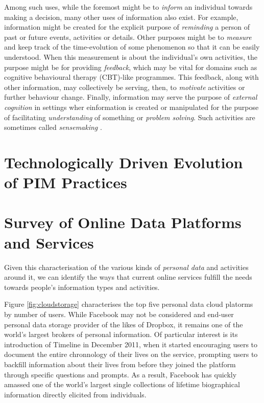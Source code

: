\documentclass[runningheads,a4paper]{llncs}
\begin{document}
Among such uses, while the foremost might be to \emph{inform} an individual towards making a decision, many other uses of information also exist.  For example, information might be created for the explicit purpose of \emph{reminding} a person of past or future events, activities or details. Other purposes might be to \emph{measure} and keep track of the time-evolution of some phenomenon so that it can be easily understood.  When this measurement is about the individual's own activities, the purpose might be for providing \emph{feedback}, which may be vital for domains such as cognitive behavioural therapy (CBT)-like programmes.  This feedback, along with other information, may collectively be serving, then, to \emph{motivate} activities or further behaviour change.  Finally, information may serve the purpose of \emph{external cognition} in settings wher einformation is created or manipulated for the purpose of facilitating \emph{understanding} of something or \emph{problem solving}.  Such activities are sometimes called \emph{sensemaking} \cite{sensemaking}.

\section{Technologically Driven Evolution of PIM Practices}

\section{Survey of Online Data Platforms and Services}

Given this characterisation of the various kinds of \emph{personal data} and activities around it, we can identify the ways that current online services fulfill the needs towards people's information types and activities.

Figure \ref{fig:cloudstorage} characterises the top five personal data cloud platorms by number of users. While Facebook may not be considered and end-user personal data storage provider of the likes of Dropbox, it remains one of the world's largest brokers of personal information.  Of particular interest is its introduction of Timeline in December 2011, when it started encouraging users to document the entire chronnology of their lives on the service, prompting users to backfill information about their lives from before they joined the platform through specific questions and prompts.  As a result, Facebook has quickly amassed one of the world's largest single collections of lifetime biographical information directly elicited from individuals.
\end{document}
